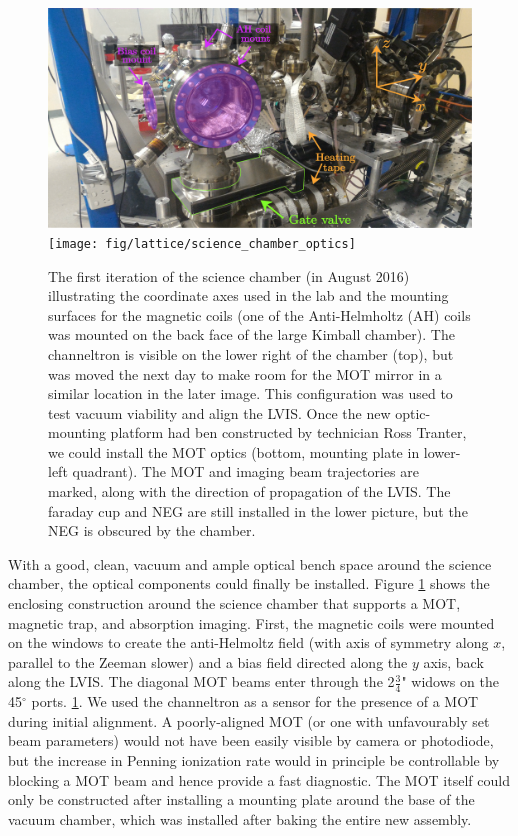 	\begin{figure}
		\includegraphics[width=\textwidth]{fig/lattice/science_chamber_oblique} %
		\texttt{[image: fig/lattice/science\_chamber\_optics]} %
		\caption{The first iteration of the science chamber (in August 2016)  illustrating the coordinate axes used in the lab and the mounting surfaces for the magnetic coils (one of the Anti-Helmholtz (AH) coils was mounted on the back face of the large Kimball chamber). 
		The channeltron is visible on the lower right of the chamber (top), but was moved the next day to make room for the MOT mirror in a similar location in the later image.
		This configuration was used to test vacuum viability and align the LVIS.
		Once the new optic-mounting platform had ben constructed by technician Ross Tranter, we could install the MOT optics (bottom, mounting plate in lower-left quadrant).
		The MOT and imaging beam trajectories are marked, along with the direction of propagation of the LVIS.
		The faraday cup and NEG are still installed in the lower picture, but the NEG is obscured by the chamber.}
		\label{fig:MOT_optics}
	\end{figure}
	With a good, clean, vacuum and ample optical bench space around the science chamber, the optical components could finally be installed.
	Figure \ref{fig:MOT_optics} shows the enclosing construction around the science chamber that supports a MOT, magnetic trap, and absorption imaging.
	First, the magnetic coils  were mounted on the windows to create the anti-Helmoltz field (with axis of symmetry along $x$, parallel to the Zeeman slower) and a bias field directed along the $y$ axis, back along the LVIS.
	The diagonal MOT beams enter through the 2$\frac{3}{4}$" widows on the 45$^\circ$ ports.
	\ref{fig:MOT_optics}.
	We used the channeltron as a sensor for the presence of a MOT during initial alignment.
	A poorly-aligned MOT (or one with unfavourably set beam parameters) would not have been easily visible by camera or photodiode, but the increase in Penning ionization rate would in principle be controllable by blocking a MOT beam and hence provide a fast diagnostic.
	The MOT itself could only be constructed after installing a mounting plate around the base of the vacuum chamber, which was installed after baking the entire new assembly.
	


